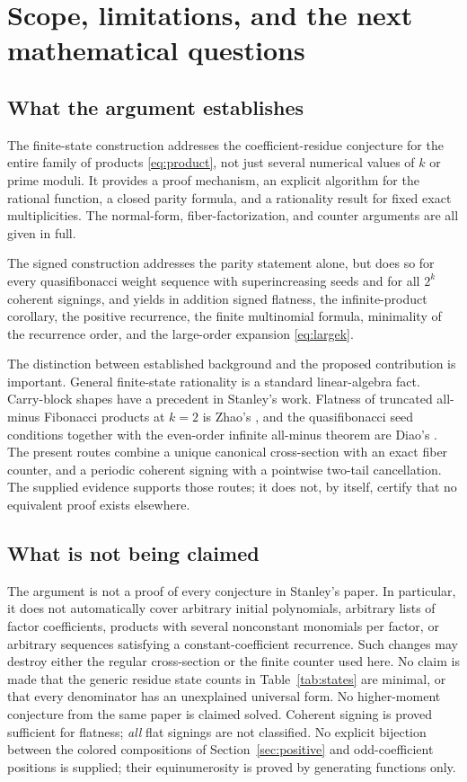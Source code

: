 \documentclass[11pt,letterpaper]{article}
\numberwithin{equation}{section}
\theoremstyle{definition}
\theoremstyle{remark}
\begin{document}
\section{Scope, limitations, and the next mathematical questions}
\label{sec:scope}

\subsection{What the argument establishes}

The finite-state construction addresses the coefficient-residue conjecture
for the entire family of products \eqref{eq:product}, not just several
numerical values of $k$ or prime moduli. It provides a proof mechanism, an
explicit algorithm for the rational function, a closed parity formula, and a
rationality result for fixed exact multiplicities. The normal-form,
fiber-factorization, and counter arguments are all given in full.

The signed construction addresses the parity statement alone, but does so
for every quasifibonacci weight sequence with superincreasing seeds and for
all $2^k$ coherent signings, and yields in addition signed flatness, the
infinite-product corollary, the positive recurrence, the finite multinomial
formula, minimality of the recurrence order, and the large-order expansion
\eqref{eq:largek}.

The distinction between established background and the proposed
contribution is important. General finite-state rationality is a standard
linear-algebra fact. Carry-block shapes have a precedent in Stanley's work.
Flatness of truncated all-minus Fibonacci products at $k=2$ is Zhao's
\cite{Zhao}, and the quasifibonacci seed conditions together with the
even-order infinite all-minus theorem are Diao's \cite{Diao}. The present
routes combine a unique canonical cross-section with an exact fiber counter,
and a periodic coherent signing with a pointwise two-tail cancellation.
The supplied evidence supports those routes; it does not, by itself, certify
that no equivalent proof exists elsewhere.

\subsection{What is not being claimed}
\label{sec:notclaimed}

The argument is not a proof of every conjecture in Stanley's paper.
In particular, it does not automatically cover arbitrary initial
polynomials, arbitrary lists of factor coefficients, products with several
nonconstant monomials per factor, or arbitrary sequences satisfying a
constant-coefficient recurrence. Such changes may destroy either the
regular cross-section or the finite counter used here. No claim is made
that the generic residue state counts in Table~\ref{tab:states} are
minimal, or that every denominator has an unexplained universal form.
No higher-moment conjecture from the same paper is claimed solved.
Coherent signing is proved sufficient for flatness; \emph{all} flat signings
are not classified. No explicit bijection between the colored compositions
of Section~\ref{sec:positive} and odd-coefficient positions is supplied;
their equinumerosity is proved by generating functions only.
\end{document}
